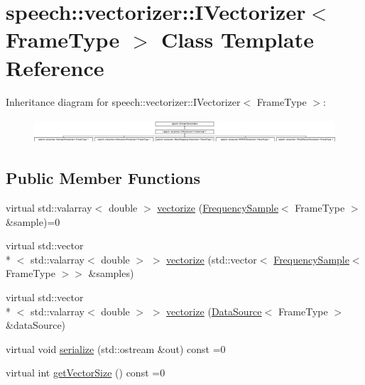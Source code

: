 \hypertarget{classspeech_1_1vectorizer_1_1IVectorizer}{\section{speech\+:\+:vectorizer\+:\+:I\+Vectorizer$<$ Frame\+Type $>$ Class Template Reference}
\label{classspeech_1_1vectorizer_1_1IVectorizer}
}
Inheritance diagram for speech\+:\+:vectorizer\+:\+:I\+Vectorizer$<$ Frame\+Type $>$\+:\begin{figure}[H]
\begin{center}
\leavevmode
\includegraphics[height=0.928177cm]{classspeech_1_1vectorizer_1_1IVectorizer}
\end{center}
\end{figure}
\subsection*{Public Member Functions}
\begin{DoxyCompactItemize}
\item 
virtual std\+::valarray$<$ double $>$ \hyperlink{classspeech_1_1vectorizer_1_1IVectorizer_a00d2ba71ec5c447780ffb0a29bfc9085}{vectorize} (\hyperlink{classspeech_1_1raw__data_1_1FrequencySample}{Frequency\+Sample}$<$ Frame\+Type $>$ \&sample)=0
\item 
virtual std\+::vector\\*
$<$ std\+::valarray$<$ double $>$ $>$ \hyperlink{classspeech_1_1vectorizer_1_1IVectorizer_a63f089697df0617f89e762582e0daef5}{vectorize} (std\+::vector$<$ \hyperlink{classspeech_1_1raw__data_1_1FrequencySample}{Frequency\+Sample}$<$ Frame\+Type $>$$>$ \&samples)
\item 
virtual std\+::vector\\*
$<$ std\+::valarray$<$ double $>$ $>$ \hyperlink{classspeech_1_1vectorizer_1_1IVectorizer_a2607a7ea800c639136c0ffb38f6aece4}{vectorize} (\hyperlink{classspeech_1_1raw__data_1_1DataSource}{Data\+Source}$<$ Frame\+Type $>$ \&data\+Source)
\item 
virtual void \hyperlink{classspeech_1_1vectorizer_1_1IVectorizer_aa8285bbd275c31ae1ce48d294400dea9}{serialize} (std\+::ostream \&out) const =0
\item 
virtual int \hyperlink{classspeech_1_1vectorizer_1_1IVectorizer_abe20529a1586c072783f42476ad7ab69}{get\+Vector\+Size} () const =0
\end{DoxyCompactItemize}
